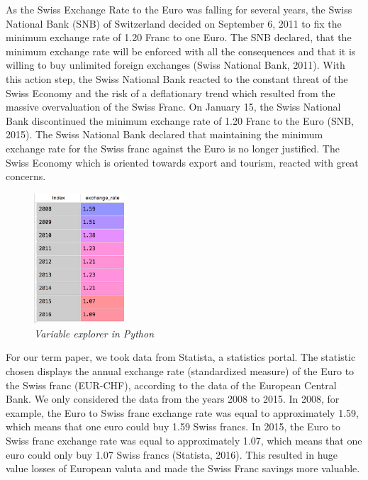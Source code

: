 \documentclass[12pt,a4paper,bibliography=totocnumbered,listof=totocnumbered]{scrartcl}
\begin{document}
As the Swiss Exchange Rate to the Euro was falling for several years, the Swiss National Bank (SNB) of Switzerland decided on September 6, 2011 to fix the minimum exchange rate of 1.20 Franc to one Euro. The SNB declared, that the minimum exchange rate will be enforced with all the consequences and that it is willing to buy unlimited foreign exchanges (Swiss National Bank, 2011). With this action step, the Swiss National Bank reacted to the constant threat of the Swiss Economy and the risk of a deflationary trend which resulted from the massive overvaluation of the Swiss Franc. On January 15, the Swiss National Bank discontinued the minimum exchange rate of 1.20 Franc to the Euro (SNB, 2015). The Swiss National Bank declared that maintaining the minimum exchange rate for the Swiss franc against the Euro is no longer justified. The Swiss Economy which is oriented towards export and tourism, reacted with great concerns. 

\begin{figure}[htbp] 
  \centering
     \includegraphics[width=0.3\textwidth]{exchange_variable}
  \caption{\textit{Variable explorer in Python}}
  \label{fig: figure1}
\end{figure}

For our term paper, we took data from Statista, a statistics portal. The statistic chosen displays the annual exchange rate (standardized measure) of the Euro to the Swiss franc (EUR-CHF), according to the data of the European Central Bank. We only considered the data from the years 2008 to 2015. In 2008, for example, the Euro to Swiss franc exchange rate was equal to approximately 1.59, which means that one euro could buy 1.59 Swiss francs. In 2015, the Euro to Swiss franc exchange rate was equal to approximately 1.07, which means that one euro could only buy 1.07 Swiss francs (Statista, 2016). This resulted in huge value losses of European valuta and made the Swiss Franc savings more valuable.
\end{document}

